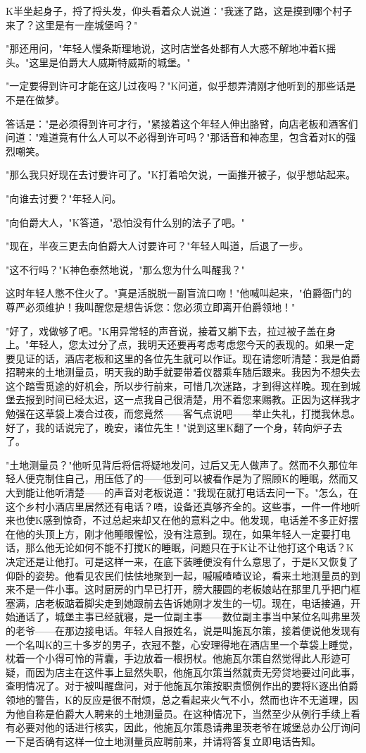 \documentclass[12pt,a4paper]{article}
\begin{document}
K半坐起身子，捋了捋头发，仰头看着众人说道："我迷了路，这是摸到哪个村子来了？这里是有一座城堡吗？"

"那还用问，"年轻人慢条斯理地说，这时店堂各处都有人大惑不解地冲着K摇头。"这里是伯爵大人威斯特威斯的城堡。"

"一定要得到许可才能在这儿过夜吗？"K问道，似乎想弄清刚才他听到的那些话是不是在做梦。

答话是："是必须得到许可才行，"紧接着这个年轻人伸出胳臂，向店老板和酒客们问道："难道竟有什么人可以不必得到许可吗？"那话音和神态里，包含着对K的强烈嘲笑。

"那么我只好现在去讨要许可了。"K打着哈欠说，一面推开被子，似乎想站起来。

"向谁去讨要？"年轻人问。

"向伯爵大人，"K答道，"恐怕没有什么别的法子了吧。"

"现在，半夜三更去向伯爵大人讨要许可？"年轻人叫道，后退了一步。

"这不行吗？"K神色泰然地说，"那么您为什么叫醒我？"

这时年轻人憋不住火了。"真是活脱脱一副盲流口吻！"他喊叫起来，"伯爵衙门的尊严必须维护！我叫醒您是想告诉您：您必须立即离开伯爵领地！"

"好了，戏做够了吧。"K用异常轻的声音说，接着又躺下去，拉过被子盖在身上。"年轻人，您太过分了点，我明天还要再考虑考虑您今天的表现的。如果一定要见证的话，酒店老板和这里的各位先生就可以作证。现在请您听清楚：我是伯爵招聘来的土地测量员，明天我的助手就要带着仪器乘车随后跟来。我因为不想失去这个踏雪觅途的好机会，所以步行前来，可惜几次迷路，才到得这样晚。现在到城堡去报到时间已经太迟，这一点我自己很清楚，用不着您来赐教。正因为这样我才勉强在这草袋上凑合过夜，而您竟然——客气点说吧——举止失礼，打搅我休息。好了，我的话说完了，晚安，诸位先生！"说到这里K翻了一个身，转向炉子去了。

"土地测量员？"他听见背后将信将疑地发问，过后又无人做声了。然而不久那位年轻人便克制住自己，用压低了的——低到可以被看作是为了照顾K的睡眠，然而又大到能让他听清楚——的声音对老板说道："我现在就打电话去问一下。"怎么，在这个乡村小酒店里居然还有电话？唔，设备还真够齐全的。这些事，一件一件地听来也使K感到惊奇，不过总起来却又在他的意料之中。他发现，电话差不多正好摆在他的头顶上方，刚才他睡眼惺忪，没有注意到。现在，如果年轻人一定要打电话，那么他无论如何不能不打搅K的睡眠，问题只在于K让不让他打这个电话？K决定还是让他打。可是这样一来，在底下装睡便没有什么意思了，于是K又恢复了仰卧的姿势。他看见农民们怯怯地聚到一起，嘁嘁喳喳议论，看来土地测量员的到来不是一件小事。这时厨房的门早已打开，膀大腰圆的老板娘站在那里几乎把门框塞满，店老板踮着脚尖走到她跟前去告诉她刚才发生的一切。现在，电话接通，开始通话了，城堡主事已经就寝，是一位副主事——数位副主事当中某位名叫弗里茨的老爷——在那边接电话。年轻人自报姓名，说是叫施瓦尔策，接着便说他发现有一个名叫K的三十多岁的男子，衣冠不整，心安理得地在酒店里一个草袋上睡觉，枕着一个小得可怜的背囊，手边放着一根拐杖。他施瓦尔策自然觉得此人形迹可疑，而因为店主在这件事上显然失职，他施瓦尔策当然就责无旁贷地要过问此事，查明情况了。对于被叫醒盘问，对于他施瓦尔策按职责惯例作出的要将K逐出伯爵领地的警告，K的反应是很不耐烦，总之看起来火气不小，然而也许不无道理，因为他自称是伯爵大人聘来的土地测量员。在这种情况下，当然至少从例行手续上看有必要对他的话进行核实，因此，他施瓦尔策恳请弗里茨老爷在城堡总办公厅询问一下是否确有这样一位土地测量员应聘前来，并请将答复立即电话告知。
\end{document}
